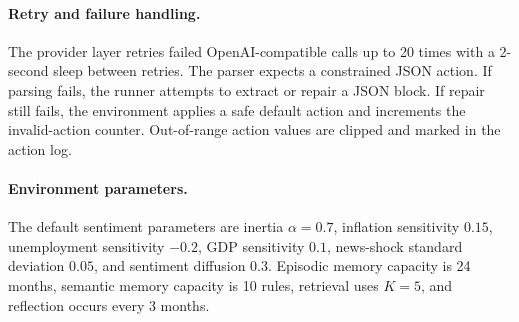 \paragraph{Retry and failure handling.}
The provider layer retries failed OpenAI-compatible calls up to 20 times with a
2-second sleep between retries.  The parser expects a constrained JSON action.
If parsing fails, the runner attempts to extract or repair a JSON block.  If
repair still fails, the environment applies a safe default action and increments
the invalid-action counter.  Out-of-range action values are clipped and marked
in the action log.

\paragraph{Environment parameters.}
The default sentiment parameters are inertia $\alpha=0.7$, inflation
sensitivity $0.15$, unemployment sensitivity $-0.2$, GDP sensitivity $0.1$,
news-shock standard deviation $0.05$, and sentiment diffusion $0.3$.  Episodic
memory capacity is 24 months, semantic memory capacity is 10 rules, retrieval
uses $K=5$, and reflection occurs every 3 months.
